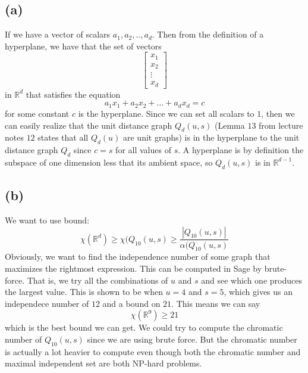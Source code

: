 \documentclass[a4paper]{article}
\begin{document}
\subsection{(a)}
If we have a vector of scalars $a_1,a_2,..,a_d$. Then from the definition of a hyperplane, we have that the set of vectors
$$
\begin{bmatrix}
x_1 \\
x_2 \\
\vdots \\
x_d
\end{bmatrix}
$$
in $\mathbb{R}^d$ that satisfies the equation
$$
a_1x_1+a_2x_2+\dots+a_dx_d = c
$$
for some constant $c$ is the hyperplane. Since we can set all scalars to $1$, then we can easily realize that the unit distance graph $Q_d(u,s)$ (Lemma $13$ from lecture notes $12$ states that all $Q_d(u)$ are unit graphs) is in the hyperplane to the unit distance graph $Q_d$ since $c=s$ for all values of $s$. A hyperplane is by definition the subspace of one dimension less that its ambient space, so $Q_d(u,s)$ is in $\mathbb{R}^{d-1}$.

\subsection{(b)}
We want to use bound:
$$
\chi(\mathbb{R}^d)\geq \chi(Q_{10}(u,s)\geq \frac{|Q_{10}(u,s)|}{\alpha(Q_{10}(u,s)}
$$
Obviously, we want to find the independence number of some graph that maximizes the rightmost expression. This can be computed in Sage by brute-force. That is, we try all the combinations of $u$ and $s$ and see which one produces the largest value. This is shown to be when $u=4$ and $s=5$, which gives us an independece number of $12$ and a bound on $21$. This means we can say
$$
\chi(\mathbb{R}^9)\geq 21
$$
which is the best bound we can get. We could try to compute the chromatic number of $Q_{10}(u,s)$ since we are using brute force. But the chromatic number is actually a lot heavier to compute even though both the chromatic number and maximal independent set are both NP-hard problems.
\end{document}

